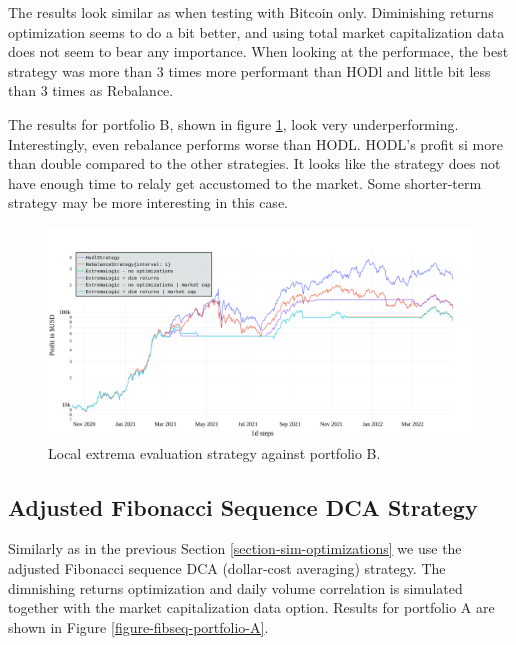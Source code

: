 The results look similar as when testing with Bitcoin only. Diminishing returns optimization seems to do a bit better, and using total market capitalization data does not seem to bear any importance. When looking at the performace, the best strategy was more than 3 times more performant than HODl and little bit less than 3 times as Rebalance.

The results for portfolio B, shown in figure \ref{figure-extrema-portfolio-B}, look very underperforming. Interestingly, even rebalance performs worse than HODL. HODL's profit si more than double compared to the other strategies. It looks like the strategy does not have enough time to relaly get accustomed to the market. Some shorter-term strategy may be more interesting in this case.

\begin{figure}[!hbt]
    \centering
    \includegraphics[width=\columnwidth]{figures/extrema-portfolio-B.pdf}
    \caption{Local extrema evaluation strategy against portfolio B.}
    \label{figure-extrema-portfolio-B}
\end{figure}


\subsection*{Adjusted Fibonacci Sequence DCA Strategy}
Similarly as in the previous Section \ref{section-sim-optimizations} we use the adjusted Fibonacci sequence DCA (dollar-cost averaging) strategy. The dimnishing returns optimization and daily volume correlation is simulated together with the market capitalization data option. Results for portfolio A are shown in Figure \ref{figure-fibseq-portfolio-A}.

